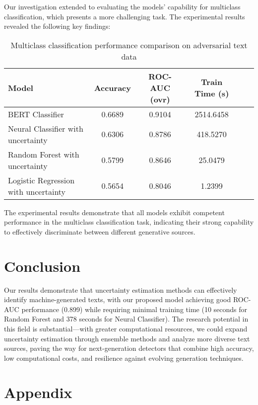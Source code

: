 \documentclass[a4paper, 12pt]{article}
\begin{document}
Our investigation extended to evaluating the models' capability for multiclass classification, which presents a more challenging task. The experimental results revealed the following key findings:

\begin{table}[ht]
\centering
\begin{tabular}{|l|c|c|c|c|c|}
\hline
\textbf{Model} & \textbf{Accuracy} & \textbf{ROC-AUC (ovr)} & \textbf{Train Time (s)} \\
\hline
BERT Classifier & 0.6689 & 0.9104 & 2514.6458 \\
Neural Classifier with uncertainty & 0.6306 & 0.8786 & 418.5270 \\
Random Forest with uncertainty & 0.5799 & 0.8646 & 25.0479 \\
Logistic Regression with uncertainty & 0.5654 & 0.8046 & 1.2399 \\
\hline
\end{tabular}
\caption{Multiclass classification performance comparison on adversarial text data}
\label{tab:model-performance-comparison}
\end{table}

The experimental results demonstrate that all models exhibit competent performance in the multiclass classification task, indicating their strong capability to effectively discriminate between different generative sources. 

\section{Conclusion}

Our results demonstrate that uncertainty estimation methods can effectively identify machine-generated texts, with our proposed model achieving good ROC-AUC performance (0.899) while requiring minimal training time (10 seconds for Random Forest and 378 seconds for Neural Classifier). The research potential in this field is substantial—with greater computational resources, we could expand uncertainty estimation through ensemble methods and analyze more diverse text sources, paving the way for next-generation detectors that combine high accuracy, low computational costs, and resilience against evolving generation techniques.




\section{Appendix}
\end{document}
